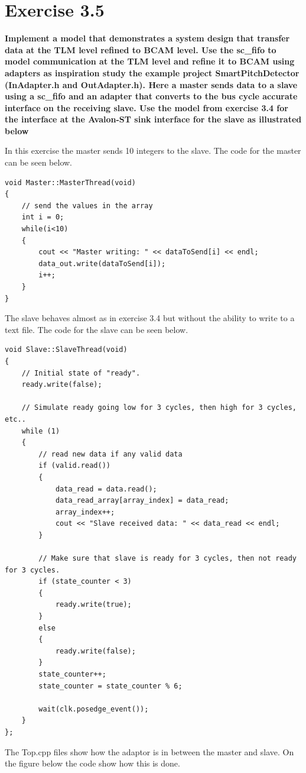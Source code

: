 
\chapter{Exercise 3.5}
\textbf{Implement a model that demonstrates a system design that transfer data at the TLM level
refined to BCAM level. Use the sc\_fifo to model communication at the TLM level and refine it to
BCAM using adapters as inspiration study the example project SmartPitchDetector (InAdapter.h
and OutAdapter.h). Here a master sends data to a slave using a sc\_fifo and an adapter that
converts to the bus cycle accurate interface on the receiving slave. Use the model from exercise
3.4 for the interface at the Avalon-ST sink interface for the slave as illustrated below}


In this exercise the master sends 10 integers to the slave. The code for the master can be seen below.
\begin{lstlisting}
void Master::MasterThread(void)
{
	// send the values in the array
	int i = 0;
	while(i<10)
	{
		cout << "Master writing: " << dataToSend[i] << endl;
		data_out.write(dataToSend[i]);
		i++;
	}
}
\end{lstlisting}

The slave behaves almost as in exercise 3.4 but without the ability to write to a text file. The code for the slave can be seen below.

\begin{lstlisting}
void Slave::SlaveThread(void)
{
	// Initial state of "ready".
	ready.write(false);
	
	// Simulate ready going low for 3 cycles, then high for 3 cycles, etc..
	while (1)
	{
		// read new data if any valid data
		if (valid.read())
		{
			data_read = data.read();
			data_read_array[array_index] = data_read;
			array_index++;
			cout << "Slave received data: " << data_read << endl;
		}
		
		// Make sure that slave is ready for 3 cycles, then not ready for 3 cycles.
		if (state_counter < 3)
		{
			ready.write(true);
		}
		else
		{
			ready.write(false);
		}
		state_counter++;
		state_counter = state_counter % 6;
		
		wait(clk.posedge_event());
	}
};
\end{lstlisting}


The Top.cpp files show how the adaptor is in between the master and slave. On the figure below the code show how this is done.


